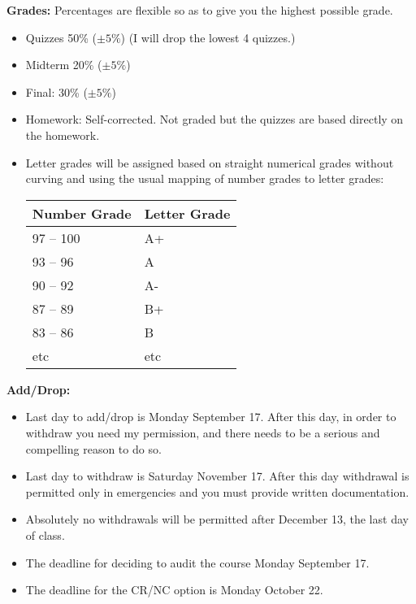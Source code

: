 \documentclass[oneside,12pt]{amsart}
\begin{document}
\textbf{Grades:} Percentages are flexible so as to give you the highest possible grade.
\begin{itemize}
\item Quizzes 50\% ($\pm5\%$) (I will drop the lowest 4 quizzes.)
\item Midterm 20\% ($\pm5\%$)
\item Final: 30\% ($\pm5\%$)
\item Homework: Self-corrected. Not graded but the quizzes are based directly on the homework.
\item Letter grades will be assigned based on straight numerical grades
without curving and using the usual mapping of number grades to letter grades:

\begin{center}
  \begin{tabular}{ | l | l |}
    \hline
    Number Grade & Letter Grade  \\ \hline \hline
    97 -- 100 & A+  \\ \hline
    93 -- 96 & A\\ \hline
    90 -- 92 & A- \\ \hline
    87 -- 89 & B+ \\ \hline
    83 -- 86 & B \\ \hline
    etc & etc \\ \hline
  \end{tabular}
\end{center}

\end{itemize}

\textbf{Add/Drop:}
\begin{itemize}
\item Last day to add/drop is Monday September 17. After this day, in order to withdraw you need my permission, and there needs to be a serious and compelling reason to do so.
\item Last day to withdraw is Saturday November 17. After this day withdrawal is permitted only in emergencies and you must provide written documentation.
\item Absolutely  no withdrawals will be permitted after December 13, the last day of class.
\item  The deadline for deciding to audit the course Monday September 17.
\item The deadline for the CR/NC option is Monday October 22.
\end{itemize}
\end{document}
